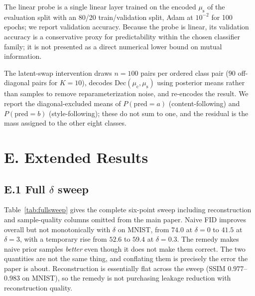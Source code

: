 \documentclass[letterpaper]{article}
\newcommand{\muc}{\mu_{\mathrm{c}}}
\newcommand{\mus}{\mu_{\mathrm{s}}}
\begin{document}
The linear probe is a single linear layer trained on the encoded $\mus$ of
the evaluation split with an 80/20 train/validation split, Adam at $10^{-2}$
for 100 epochs; we report validation accuracy. Because the probe is linear,
its validation accuracy is a conservative proxy for predictability within
the chosen classifier family; it is not presented as a direct numerical
lower bound on mutual information.

The latent-swap intervention draws $n{=}100$ pairs per ordered class pair
($90$ off-diagonal pairs for $K{=}10$), decodes $\mathrm{Dec}(\muc,\mus)$
using posterior means rather than samples to remove reparameterization noise,
and re-encodes the result. We report the diagonal-excluded means of
$P(\mathrm{pred}{=}a)$ (content-following) and $P(\mathrm{pred}{=}b)$
(style-following); these do not sum to one, and the residual is the mass
assigned to the other eight classes.

\section{E. Extended Results}

\subsection{E.1 Full $\delta$ sweep}

Table~\ref{tab:fullsweep} gives the complete six-point sweep including
reconstruction and sample-quality columns omitted from the main paper.
Naive FID improves overall but not monotonically with $\delta$ on MNIST,
from $74.0$ at $\delta{=}0$ to $41.5$ at $\delta{=}3$, with a temporary rise
from $52.6$ to $59.4$ at $\delta{=}0.3$. The
remedy makes naive prior samples \emph{better} even though it does not make
them correct. The two quantities are not the same thing, and conflating them
is precisely the error the paper is about. Reconstruction is essentially
flat across the sweep (SSIM $0.977$--$0.983$ on MNIST), so the remedy is not
purchasing leakage reduction with reconstruction quality.
\end{document}
